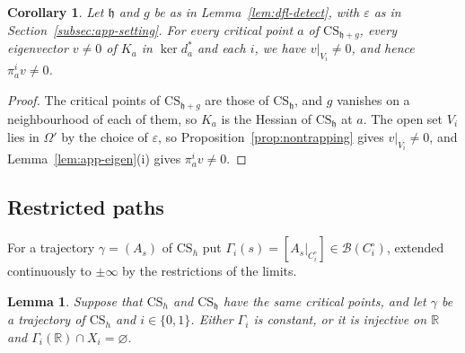 \documentclass[11pt]{amsart}
\newtheorem{lemma}[theorem]{Lemma}
\newtheorem{corollary}[theorem]{Corollary}
\theoremstyle{definition}
\theoremstyle{remark}
\theoremstyle{plain}
\numberwithin{equation}{section}
\newcommand{\RR}{\mathbb{R}}
\newcommand{\cB}{\mathcal{B}}
\newcommand{\eps}{\varepsilon}
\begin{document}
\begin{corollary}\label{cor:app-nontrapping}
Let $\mathfrak h$ and $g$ be as in Lemma~\ref{lem:dfl-detect}, with $\eps$ as in
Section~\ref{subsec:app-setting}. For every critical point $a$ of $\mathrm{CS}_{\mathfrak h+g}$,
every eigenvector $v\ne0$ of $K_a$ in $\ker d_a^*$ and each $i$, we have $v|_{V_i}\ne0$, and
hence $\pi^i_av\ne0$.
\end{corollary}

\begin{proof}
The critical points of $\mathrm{CS}_{\mathfrak h+g}$ are those of $\mathrm{CS}_{\mathfrak h}$, and
$g$ vanishes on a neighbourhood of each of them, so $K_a$ is the Hessian of
$\mathrm{CS}_{\mathfrak h}$ at $a$. The open set $V_i$ lies in $\Omega'$ by the choice of $\eps$,
so Proposition~\ref{prop:nontrapping} gives $v|_{V_i}\ne0$, and
Lemma~\ref{lem:app-eigen}(i) gives $\pi^i_av\ne0$.
\end{proof}

\subsection{Restricted paths}

For a trajectory $\gamma=(A_s)$ of $\mathrm{CS}_h$ put
$\Gamma_i(s)=[A_s|_{C_i^\circ}]\in\cB(C_i^\circ)$, extended continuously to $\pm\infty$ by the
restrictions of the limits.

\begin{lemma}\label{lem:app-hybrid}
Suppose that $\mathrm{CS}_h$ and $\mathrm{CS}_{\mathfrak h}$ have the same critical points, and
let $\gamma$ be a trajectory of $\mathrm{CS}_h$ and $i\in\{0,1\}$. Either $\Gamma_i$ is constant,
or it is injective on $\RR$ and $\Gamma_i(\RR)\cap X_i=\varnothing$.
\end{lemma}
\end{document}
